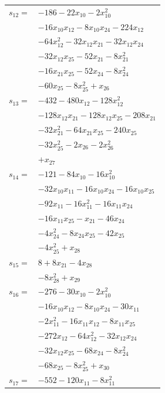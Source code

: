 \begin{longtable}{@{}r@{\;}l@{}}
\(s_{12}=\) & \(\displaystyle -186 -22x_{10} -2x_{10}^{2}\) \\
 & \(\displaystyle -16x_{10}x_{12} -8x_{10}x_{24} -224x_{12}\) \\
 & \(\displaystyle -64x_{12}^{2} -32x_{12}x_{21} -32x_{12}x_{24}\) \\
 & \(\displaystyle -32x_{12}x_{25} -52x_{21} -8x_{21}^{2}\) \\
 & \(\displaystyle -16x_{21}x_{25} -52x_{24} -8x_{24}^{2}\) \\
 & \(\displaystyle -60x_{25} -8x_{25}^{2} +x_{26}\) \\[3pt]
\(s_{13}=\) & \(\displaystyle -432 -480x_{12} -128x_{12}^{2}\) \\
 & \(\displaystyle -128x_{12}x_{21} -128x_{12}x_{25} -208x_{21}\) \\
 & \(\displaystyle -32x_{21}^{2} -64x_{21}x_{25} -240x_{25}\) \\
 & \(\displaystyle -32x_{25}^{2} -2x_{26} -2x_{26}^{2}\) \\
 & \(\displaystyle +x_{27}\) \\[3pt]
\(s_{14}=\) & \(\displaystyle -121 -84x_{10} -16x_{10}^{2}\) \\
 & \(\displaystyle -32x_{10}x_{11} -16x_{10}x_{24} -16x_{10}x_{25}\) \\
 & \(\displaystyle -92x_{11} -16x_{11}^{2} -16x_{11}x_{24}\) \\
 & \(\displaystyle -16x_{11}x_{25} -x_{21} -46x_{24}\) \\
 & \(\displaystyle -4x_{24}^{2} -8x_{24}x_{25} -42x_{25}\) \\
 & \(\displaystyle -4x_{25}^{2} +x_{28}\) \\[3pt]
\(s_{15}=\) & \(\displaystyle 8 +8x_{21} -4x_{28}\) \\
 & \(\displaystyle -8x_{28}^{2} +x_{29}\) \\[3pt]
\(s_{16}=\) & \(\displaystyle -276 -30x_{10} -2x_{10}^{2}\) \\
 & \(\displaystyle -16x_{10}x_{12} -8x_{10}x_{24} -30x_{11}\) \\
 & \(\displaystyle -2x_{11}^{2} -16x_{11}x_{12} -8x_{11}x_{25}\) \\
 & \(\displaystyle -272x_{12} -64x_{12}^{2} -32x_{12}x_{24}\) \\
 & \(\displaystyle -32x_{12}x_{25} -68x_{24} -8x_{24}^{2}\) \\
 & \(\displaystyle -68x_{25} -8x_{25}^{2} +x_{30}\) \\[3pt]
\(s_{17}=\) & \(\displaystyle -552 -120x_{11} -8x_{11}^{2}\) \\

\end{longtable}
